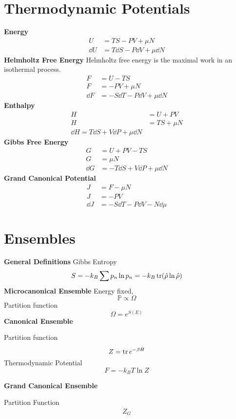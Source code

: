 \documentclass[prb,12pt]{revtex4-2}
\theoremstyle{definition}
\theoremstyle{definition}
\theoremstyle{definition}
\begin{document}
\section{Thermodynamic Potentials}
\textbf{Energy}
\begin{align*}
	U&= TS - PV + \mu N\\
	\dd{U} &= T\dd{S}-P\dd{V}+\mu\dd{N}
\end{align*}
\textbf{Helmholtz Free Energy}
Helmholtz free energy is the maximal work in an isothermal process.
\begin{align*}
	F&= U - TS\\
	F &= -PV + \mu N\\
	\dd{F}&= -S\dd{T} -P\dd{V} + \mu \dd{N}
\end{align*}
\textbf{Enthalpy}
\begin{align*}
	H &= U + PV\\
	H &= TS + \mu N\\
	\dd{H} = T\dd{S} + V\dd{P} + \mu \dd{N}
\end{align*}
\textbf{Gibbs Free Energy}
\begin{align*}
	G&= U + PV - TS\\
	G&=\mu N\\
	\dd{G}&= - T\dd{S} + V\dd{P} + \mu \dd{N}
\end{align*}
\textbf{Grand Canonical Potential}
\begin{align*}
	J &=F - \mu N\\
	J &= - PV\\
	\dd{J} &= -S\dd{T} - P \dd{V} - N \dd{\mu}
\end{align*}
\section{Ensembles}
\textbf{General Definitions}
Gibbs Entropy
\[S = -k_B \sum p_n \ln p_n=-k_B \tr(\hat{\rho}\ln \hat{\rho})\]
\textbf{Microcanonical Ensemble}
Energy fixed, 
\[\mathbb{P} \propto \Omega\]
Partition function
\[\Omega = e^{S(E)}\]
\textbf{Canonical Ensemble}

Partition function
\[Z = \tr e^{-\beta \hat{H}}\]
Thermodynamic Potential
\[F = -k_B T \ln Z\]

\textbf{Grand Canonical Ensemble}

Partition Function
\begin{align*}
Z_G
\end{align*}
\end{document}

